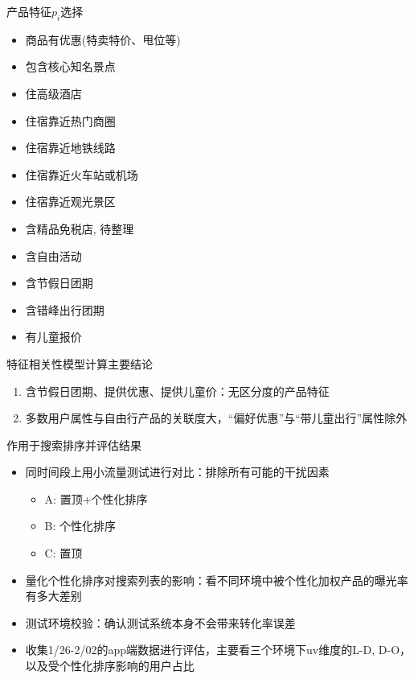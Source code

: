 \documentclass{beamer}
\begin{document}
\begin{CJK}{UTF8}{gbsn}
\begin{frame}{产品特征$p_i$选择}
  \begin{itemize}
  \item { 商品有优惠(特卖特价、甩位等) }
  \item { 包含核心知名景点 }
  \item { 住高级酒店 }
  \item { 住宿靠近热门商圈 }
  \item { 住宿靠近地铁线路 }
  \item { 住宿靠近火车站或机场 }
  \item { 住宿靠近观光景区 }
  \item { 含精品免税店, 待整理 }
  \item { 含自由活动 }
  \item { 含节假日团期 }
  \item { 含错峰出行团期 }
  \item { 有儿童报价 }
  \end{itemize}
\end{frame}

\begin{frame}{特征相关性模型计算主要结论}
  \begin{enumerate}
  \item {含节假日团期、提供优惠、提供儿童价：无区分度的产品特征}
  \item {多数用户属性与自由行产品的关联度大，“偏好优惠”与“带儿童出行”属性除外}
  \end{enumerate}
\end{frame}

\begin{frame}{作用于搜索排序并评估结果}
  \begin{itemize}
  \item {
    同时间段上用小流量测试进行对比：排除所有可能的干扰因素
    \begin{itemize}
    \item {A: 置顶+个性化排序 }
    \item {B: 个性化排序}
    \item {C: 置顶}
    \end{itemize}
  }
  \item {
    量化个性化排序对搜索列表的影响：看不同环境中被个性化加权产品的曝光率有多大差别
  }
  \item {测试环境校验：确认测试系统本身不会带来转化率误差}
  \item {
    收集1/26-2/02的app端数据进行评估，主要看三个环境下uv维度的L-D, D-O，以及受个性化排序影响的用户占比
  }
  \end{itemize}
  

\end{frame}
\end{CJK}
\end{document}
